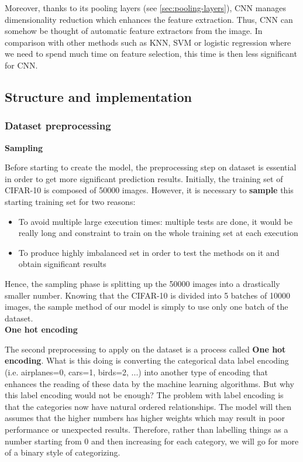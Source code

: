 \documentclass[11pt, openany]{report}
\theoremstyle{plain}
\theoremstyle{definition}
\theoremstyle{remark}
\begin{document}
Moreover, thanks to its pooling layers (see \autoref{sec:pooling-layers}), CNN manages dimensionality reduction which enhances the feature extraction. Thus, CNN can somehow be thought of automatic feature extractors from the image. In comparison with other methods such as KNN, SVM or logistic regression where we need to spend much time on feature selection, this time is then less significant for CNN.   

\subsection{Structure and implementation}

\subsubsection{Dataset preprocessing}

\textbf{Sampling}

Before starting to create the model, the preprocessing step on dataset is essential in order to get more significant prediction results. Initially, the training set of CIFAR-10 is composed of 50000 images. However, it is necessary to \textbf{sample} this starting training set for two reasons: 
\begin{itemize}
\item To avoid multiple large execution times: multiple tests are done, it would be really long and constraint to train on the whole training set at each execution 
\item To produce highly imbalanced set in order to test the methods on it and obtain significant results
\end{itemize}

Hence, the sampling phase is splitting up the 50000 images into a drastically smaller number. Knowing that the CIFAR-10 is divided into 5 batches of 10000 images, the sample method of our model is simply to use only one batch of the dataset.  \\

\textbf{One hot encoding} 

The second preprocessing to apply on the dataset is a process called \textbf{One hot encoding}. What is this doing is converting the categorical data label encoding (i.e. airplanes=0, cars=1, birds=2, ...) into another type of encoding that enhances the reading of these data by the machine learning algorithms. But why this label encoding would not be enough?  The problem with label encoding is that the categories now have natural ordered relationships. The model will then assumes that the higher numbers has higher weights which may result in poor performance or unexpected results. Therefore, rather than labelling things as a number starting from 0 and then increasing for each category, we will go for more of a binary style of categorizing.  
\end{document}
